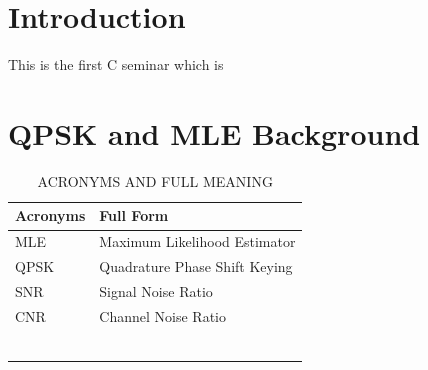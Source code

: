 \documentclass[technicalreport]{ieicej}
\begin{document}
\maketitle

\section{Introduction}
This is the first C seminar which is \cite{wiki:Additive_white_Gaussian_noise}

\section{QPSK and MLE Background}

\begin{table}[tbp]
	\begin{center}
	\caption{ACRONYMS AND FULL MEANING}
	\begin{tabular}{|l|l|}
	\hline
	\textbf{Acronyms} & \textbf{Full Form} \\
	\hline
	 MLE & Maximum Likelihood Estimator  \\ 
	 \hline
	 QPSK & Quadrature Phase Shift Keying  \\ 
	 \hline
	 SNR & Signal Noise Ratio \\ 
	 \hline
	 CNR & Channel Noise Ratio  \\ 
	 \hline
	 &  \\ 
	 \hline
	 &  \\ 
	 \hline
	 &  \\ 
	 \hline
	 &  \\ 
	 \hline
	 &  \\ 
	 \hline
	 &  \\ 
	 \hline
	\end{tabular}
	\end{center}
\end{table}
\end{document}

